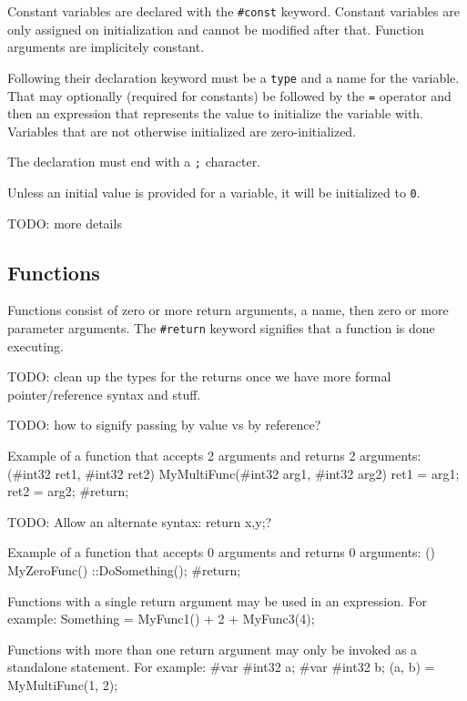 \documentclass{article}
\newcommand{\code}[1]{\colorbox{light-gray}{\texttt{#1}}}
\newenvironment{codebox} {\snugshade\verbatim} {\endverbatim\endsnugshade}
\begin{document}
Constant variables are declared with the \code{\#const} keyword.  Constant variables are only assigned on initialization and cannot be modified after that.  Function arguments are implicitely constant.

Following their declaration keyword must be a \code{type} and a name for the variable.  That may optionally (required for constants) be followed by the \code{=} operator and then an expression that represents the value to initialize the variable with.  Variables that are not otherwise initialized are zero-initialized.

The declaration must end with a \code{;} character.

Unless an initial value is provided for a variable, it will be initialized to \code{0}.

TODO: more details

\subsection{Functions}

Functions consist of zero or more return arguments, a name, then zero or more parameter arguments.  The \code{\#return} keyword signifies that a function is done executing.

TODO: clean up the types for the returns once we have more formal pointer/reference syntax and stuff.

TODO: how to signify passing by value vs by reference?

Example of a function that accepts 2 arguments and returns 2 arguments:
\begin{codebox}
(#int32 ret1, #int32 ret2) MyMultiFunc(#int32 arg1, #int32 arg2)
{
    ret1 = arg1;
    ret2 = arg2;
    #return;
}
\end{codebox}

TODO: Allow an alternate syntax: return x,y;?

Example of a function that accepts 0 arguments and returns 0 arguments:
\begin{codebox}
() MyZeroFunc()
{
    ::DoSomething();
    #return;
}
\end{codebox}

Functions with a single return argument may be used in an expression.  For example:
\begin{codebox}
Something = MyFunc1() + 2 + MyFunc3(4);
\end{codebox}

Functions with more than one return argument may only be invoked as a standalone statement.  For example:
\begin{codebox}
#var #int32 a;
#var #int32 b;
(a, b) = MyMultiFunc(1, 2);
\end{codebox}
\end{document}
